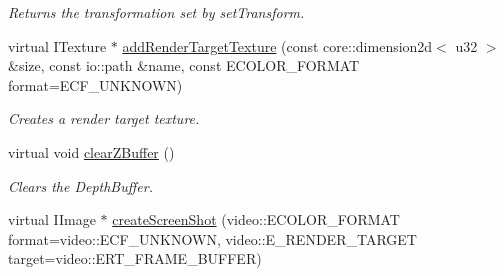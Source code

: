 \begin{DoxyCompactItemize}
\begin{DoxyCompactList}\small\item\em Returns the transformation set by set\-Transform. \end{DoxyCompactList}\item 
\hypertarget{classirr_1_1video_1_1_c_burning_video_driver_a4c53a99a39f9d98f58d9b1fe2b1f66d8}{virtual I\-Texture $\ast$ \hyperlink{classirr_1_1video_1_1_c_burning_video_driver_a4c53a99a39f9d98f58d9b1fe2b1f66d8}{add\-Render\-Target\-Texture} (const core\-::dimension2d$<$ u32 $>$ \&size, const io\-::path \&name, const E\-C\-O\-L\-O\-R\-\_\-\-F\-O\-R\-M\-A\-T format=E\-C\-F\-\_\-\-U\-N\-K\-N\-O\-W\-N)}\label{classirr_1_1video_1_1_c_burning_video_driver_a4c53a99a39f9d98f58d9b1fe2b1f66d8}

\begin{DoxyCompactList}\small\item\em Creates a render target texture. \end{DoxyCompactList}\item 
\hypertarget{classirr_1_1video_1_1_c_burning_video_driver_a95c9a9a76d8a3fd695961ea9ec279734}{virtual void \hyperlink{classirr_1_1video_1_1_c_burning_video_driver_a95c9a9a76d8a3fd695961ea9ec279734}{clear\-Z\-Buffer} ()}\label{classirr_1_1video_1_1_c_burning_video_driver_a95c9a9a76d8a3fd695961ea9ec279734}

\begin{DoxyCompactList}\small\item\em Clears the Depth\-Buffer. \end{DoxyCompactList}\item 
\hypertarget{classirr_1_1video_1_1_c_burning_video_driver_a1b0bd4281c7751c9be5840d4960b481c}{virtual I\-Image $\ast$ \hyperlink{classirr_1_1video_1_1_c_burning_video_driver_a1b0bd4281c7751c9be5840d4960b481c}{create\-Screen\-Shot} (video\-::\-E\-C\-O\-L\-O\-R\-\_\-\-F\-O\-R\-M\-A\-T format=video\-::\-E\-C\-F\-\_\-\-U\-N\-K\-N\-O\-W\-N, video\-::\-E\-\_\-\-R\-E\-N\-D\-E\-R\-\_\-\-T\-A\-R\-G\-E\-T target=video\-::\-E\-R\-T\-\_\-\-F\-R\-A\-M\-E\-\_\-\-B\-U\-F\-F\-E\-R)}\label{classirr_1_1video_1_1_c_burning_video_driver_a1b0bd4281c7751c9be5840d4960b481c}


\end{DoxyCompactItemize}
